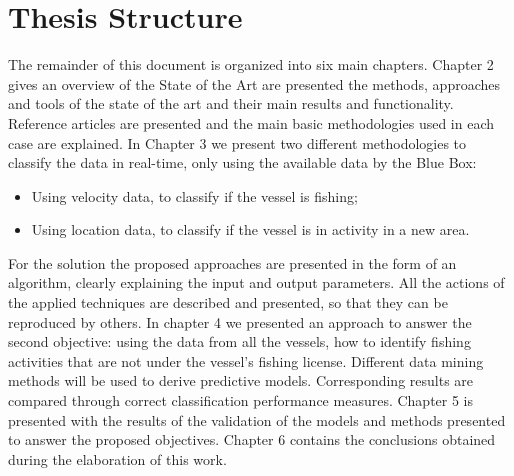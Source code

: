 \section{Thesis Structure} %
\label{sec:work_structure}
The remainder of this document is organized into six main chapters. Chapter 2 gives an overview of the State of the Art are presented the methods, approaches and tools of the state of the art and their main results and functionality. Reference articles are presented and the main basic methodologies used in each case are explained. 
In Chapter 3 we present two different methodologies to classify the data in real-time, only using the available data by the Blue Box:
\begin{itemize}
\item Using velocity data, to classify if the vessel is fishing;
\item Using location data, to classify if the vessel is in activity in a new area.
\end{itemize}
For the solution the proposed approaches are presented in the form of an algorithm, clearly explaining the input and output parameters. All the actions of the applied techniques are described and presented, so that they can be reproduced by others.
In chapter 4 we presented an approach to answer the second objective: using the data from all the vessels, how to identify fishing activities that are not under the vessel's fishing license. Different data mining methods will be used to derive predictive models. Corresponding results are compared through correct classification performance measures.
Chapter 5 is presented with the results of the validation of the models and methods presented to answer the proposed objectives.
Chapter 6 contains the conclusions obtained during the elaboration of this work.





